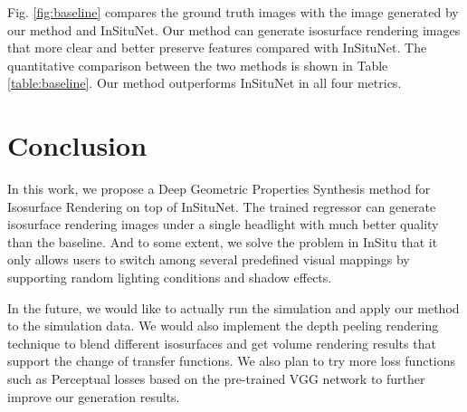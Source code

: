 \documentclass[journal]{vgtc}                %
\begin{document}
Fig. \ref{fig:baseline} compares the ground truth images with the image generated by our method and InSituNet. Our method can generate isosurface rendering images that more clear and better preserve features compared with InSituNet. The quantitative comparison between the two methods is shown in Table \ref{table:baseline}. Our method outperforms InSituNet in all four metrics. 

\section{Conclusion}
In this work, we propose a Deep Geometric Properties Synthesis method for Isosurface Rendering on top of InSituNet. The trained regressor can generate isosurface rendering images under a single headlight with much better quality than the baseline. And to some extent, we solve the problem in InSitu that it only allows users to switch among several predefined visual mappings by supporting random lighting conditions and shadow effects. 

In the future, we would like to actually run the simulation and apply our method to the simulation data. We would also implement the depth peeling rendering technique to blend different isosurfaces and get volume rendering results that support the change of transfer functions. We also plan to try more loss functions such as Perceptual losses based on the pre-trained VGG network \cite{gatys2016image} to further improve our generation results. 

%

%
%
%


\end{document}
